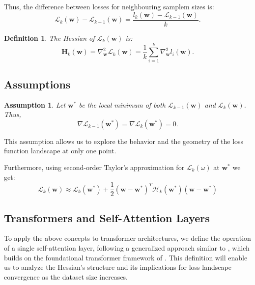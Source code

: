 \documentclass{article}
\newtheorem{definition}{Definition}
\newtheorem{assumption}{Assumption}
\begin{document}
Thus, the difference between losses for neighbouring samplem sizes is:
$$\mathcal{L}_{k}(\mathbf{w}) - \mathcal{L}_{k-1}(\mathbf{w}) = \frac{l_{k}(\mathbf{w}) - \mathcal{L}_{k-1}(\mathbf{w})}{k}.$$

\begin{definition}
  The Hessian of \(\mathcal{L}_{k}(\mathbf{w})\) is:
  \[
  \mathbf{H}_k(\mathbf{w}) = \nabla^2_{\mathbf{w}} \mathcal{L}_{k}(\mathbf{w}) = \frac{1}{k} \sum_{i=1}^k \nabla^2_{\mathbf{w}} l_i(\mathbf{w}).
  \]
\end{definition}


\subsection{Assumptions}

\begin{assumption}
  Let $\mathbf{w}^*$ be the local minimum of both $\mathcal{L}_{k-1}(\mathbf{w})$ and $\mathcal{L}_{k}(\mathbf{w})$.
  Thus, $$\nabla \mathcal{L}_{k-1}(\mathbf{w}^*) = \nabla \mathcal{L}_{k}(\mathbf{w}^*) = 0.$$
\end{assumption}

This assumption allows us to explore the behavior and the geometry of the loss function landscape at only one point.

Furthermore, using second-order Taylor's approximation for $\mathcal{L}_{k}(\omega)$ at $\mathbf{w}^*$ we get:
$$\mathcal{L}_{k}(\mathbf{w}) \approx \mathcal{L}_{k}(\mathbf{w}^*) + \frac12 (\mathbf{w} - \mathbf{w}^*)^T \mathcal{H}_k(\mathbf{w}^*)
  (\mathbf{w} - \mathbf{w}^*)$$

\subsection{Transformers and Self-Attention Layers}
To apply the above concepts to transformer architectures, we define the operation of a single self-attention layer, following a generalized approach similar to \cite{ormaniec2024attentionhessian}, which builds on the foundational transformer framework of \cite{vaswani2017attention}. This definition will enable us to analyze the Hessian's structure and its implications for loss landscape convergence as the dataset size increases.
\end{document}
